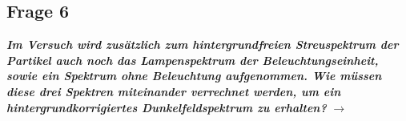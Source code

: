 \subsection{\label{subsec:FZV6}Frage 6}
\textbf{\textit{Im Versuch wird zusätzlich zum hintergrundfreien Streuspektrum der Partikel auch
noch das Lampenspektrum der Beleuchtungseinheit, sowie ein Spektrum ohne Beleuchtung
aufgenommen. Wie müssen diese drei Spektren miteinander verrechnet
werden, um ein hintergrundkorrigiertes Dunkelfeldspektrum zu erhalten?}}
$\rightarrow$